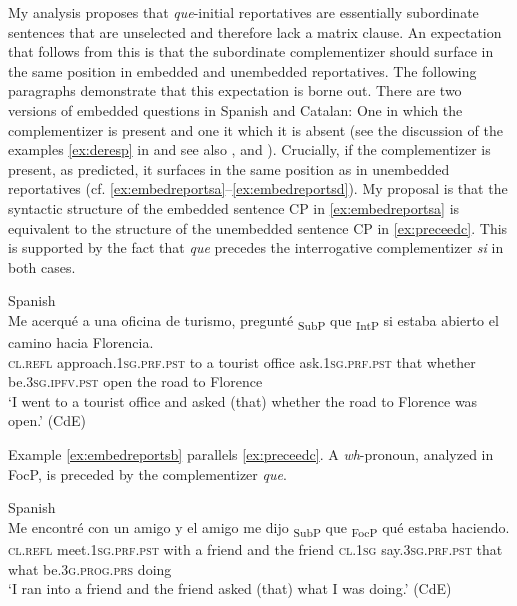 My analysis proposes that \emph{que}-initial reportatives are essentially subordinate sentences that are unselected and therefore lack a matrix clause. An expectation that follows from this is that  the subordinate complementizer should surface in the same position in embedded and unembedded reportatives. The following paragraphs demonstrate that this expectation is borne out. There are two versions of embedded questions in Spanish and Catalan: One in which the complementizer is present and one it which it is absent (see the discussion of the  examples \eqref{ex:deresp} in   and  see also \citealt{Etxepare2010}, \citealt{GonzalesPlanas2014} and \citealt{Corr2016}). Crucially, if the complementizer is present, as predicted, it surfaces in the same position as in unembedded reportatives (cf. \ref{ex:embedreportsa}--\ref{ex:embedreportsd}).  My proposal  is that the syntactic structure of the embedded sentence CP in \eqref{ex:embedreportsa} is equivalent to the structure of the unembedded sentence CP in \eqref{ex:preceedc}. This is supported by the fact that \emph{que} precedes the interrogative complementizer \emph{si} in both cases.\pagebreak


\ea\label{ex:embedreportsa}
Spanish\\ 
\gll Me acerqué  a una {oficina de turismo}, pregunté {\ob}\textsubscript{SubP} que{\cb}  {\ob}\textsubscript{IntP} si{\cb}  estaba abierto el camino hacia Florencia. \\
	\textsc{cl.refl} approach.\textsc{1sg.prf.pst} to a {tourist office} ask.\textsc{1sg.prf.pst} {} that {} whether be.\textsc{3sg.ipfv.pst} open the road to Florence\\
	\glt `I went to a tourist office and asked (that) whether the road to Florence was open.' (CdE)
\z

Example \eqref{ex:embedreportsb} parallels \eqref{ex:preceedc}. A \textit{wh}-pronoun, analyzed in FocP, is preceded by the complementizer \emph{que}.\largerpage

\ea\label{ex:embedreportsb}
 Spanish\\ 
\gll Me encontré con un amigo y el amigo me dijo  {\ob}\textsubscript{SubP} que{\cb}  {\ob}\textsubscript{FocP} qué{\cb}  estaba haciendo.  \\
\textsc{cl.refl} meet.\textsc{1sg.prf.pst} with a friend and the friend \textsc{cl.1sg} say.\textsc{3sg.prf.pst} {} that {} what be.\textsc{3g.prog.prs} doing\\
\glt `I ran into  a friend and the friend asked (that) what I was doing.' (CdE)
\z


